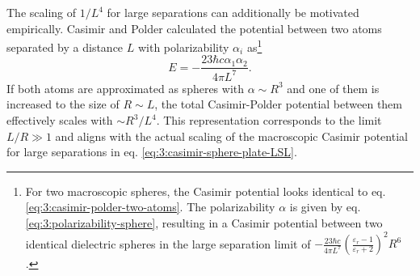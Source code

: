 The scaling of $1/L^4$ for large separations can additionally be motivated empirically. Casimir and Polder \cite{Casimir_1948a} calculated the potential between two atoms separated by a distance $L$ with polarizability $\alpha_i$ as\footnote{For two macroscopic spheres, the Casimir potential looks identical to eq. \eqref{eq:3:casimir-polder-two-atoms}. The polarizability $\alpha$ is given by eq. \eqref{eq:3:polarizability-sphere}, resulting in a Casimir potential between two identical dielectric spheres in the large separation limit of $-\frac{23 \hbar c}{4\pi L^7}\left(\frac{\varepsilon_r - 1}{\varepsilon_r + 2}\right)^2R^6$ \cite{Emig_2007}.}
\begin{equation}\label{eq:3:casimir-polder-two-atoms}
  E = -\frac{23 \hbar  c \alpha_1 \alpha_2}{4 \pi L^7} .
\end{equation}
If both atoms are approximated as spheres with $\alpha \sim R^3$ and one of them is increased to the size of $R \sim L$, the total Casimir-Polder potential between them effectively scales with $\sim R^3/L^4$.
This representation corresponds to the limit $L/R \gg 1$ and aligns with the actual scaling of the macroscopic Casimir potential for large separations in eq. \eqref{eq:3:casimir-sphere-plate-LSL}.

